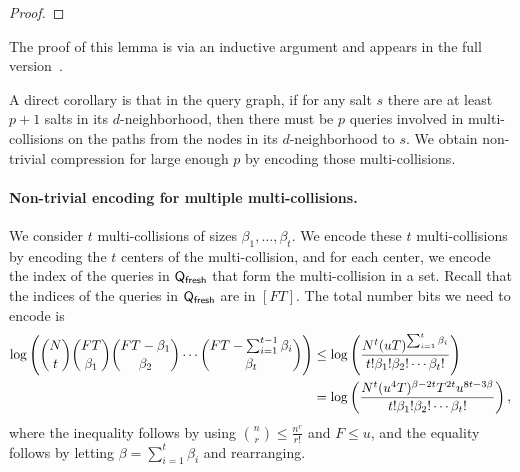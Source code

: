 {\begin{proof}



\end{proof}
}
\ifnum{}
\prooflemneigh
\else
The proof of this lemma is via an inductive argument and appears in the full version~\cite{full}.%
\fi

A direct corollary is that in the query graph, if for any salt $s$ there are at least $p+1$ salts in its $d$-neighborhood, then there must be $p$ queries involved in multi-collisions on the paths from the nodes in its $d$-neighborhood to $s$. 
We obtain non-trivial compression for large enough $p$ by encoding those multi-collisions. 

\paragraph{Non-trivial encoding for multiple multi-collisions.} 
We consider $t$ multi-collisions of sizes $\beta_1,\ldots,\beta_t$. 
We encode these $t$ multi-collisions by encoding the $t$ centers of the multi-collision, and for each center, we encode the index of the queries in $\mathsf{Q}_\textsf{fresh}$ that form the multi-collision in a set. Recall that the indices of the queries in $\mathsf{Q}_\textsf{fresh}$ are in $[FT]$.
The total number bits we need to encode is
\begin{align}
\ifnum\eprintversion=1
\log \left(\binom{N}{t} \binom{FT}{\beta_1}\binom{FT-\beta_1}{\beta_2}\cdots \binom{FT-\sum_{i=1}^{t-1}\beta_i}{\beta_t}\right) & \le \log \left(\frac{N^t (uT)^{\sum_{i=1}^t\beta_i}}{t!\beta_1!\beta_2!\cdots \beta_t!} \right) \nonumber\\
\else
\log \Biggl(\binom{N}{t} \binom{FT}{\beta_1}\cdots \binom{FT-\sum_{i=1}^{t-1}\beta_i}{\beta_t}\Biggr)  &\le \log \left(\frac{N^t (uT)^{\sum_{i=1}^t\beta_i}}{t!\beta_1!\beta_2!\cdots \beta_t!} \right) \nonumber\\
\fi
& = \log \left(\frac{N^t (u^4T)^{\beta-2t} T^{2t}u^{8t-3\beta} }{t!\beta_1!\beta_2!\cdots \beta_t!} \right), \label{eq:bound}
\end{align}
where the inequality follows by using $\binom{n}{r}\leq \frac{n^r}{r!}$ and $F\leq u$, and the equality follows by letting $\beta=\sum_{i=1}^t\beta_i$ and rearranging.

